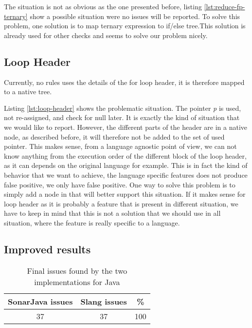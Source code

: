 

The situation is not as obvious as the one presented before, listing \ref{lst:reduce-fp-ternary} show a possible situation were no issues will be reported. To solve this problem, one solution is to map ternary expression to if/else tree.This solution is already used for other checks and seems to solve our problem nicely.

\subsection{Loop Header}
\label{subsec:loop_header}

Currently, no rules uses the details of the for loop header, it is therefore mapped to a native tree. 



Listing \ref{lst:loop-header} shows the problematic situation. The pointer \emph{p} is used, not re-assigned, and check for null later. 
It is exactly the kind of situation that we would like to report. 
However, the different parts of the header are in a native node, as described before, it will therefore not be added to the set of used pointer. 
This makes sense, from a language agnostic point of view, we can not know anything from the execution order of the different block of the loop header, as it can depends on the original language for example. 
This is in fact the kind of behavior that we want to achieve, the language specific features does not produce false positive, we only have false positive. 
One way to solve this problem is to simply add a node in \slang that will better support this situation. 
If it makes sense for loop header as it is probably a feature that is present in different situation, we have to keep in mind that this is not a solution that we should use in all situation, where the feature is really specific to a language.

\subsection{Improved results}
\label{subsec:improved_results}

\begin{table}[h]
	\centering
	\caption{Final issues found by the two implementations for Java}
	\label{table:final-sonarjava-vs-slang}
	\begin{tabular}{|c|c|c|}
		\hline
		\bf SonarJava issues & \bf Slang issues & \bf \% \\ \hline
		37 &  37 &  100 \\ \hline
	\end{tabular}
\end{table}

